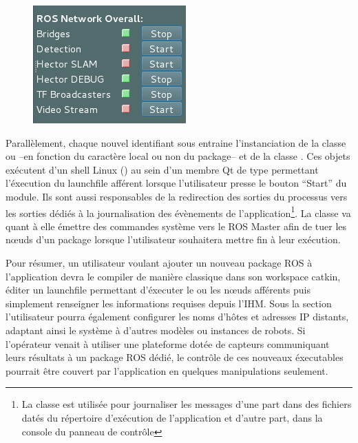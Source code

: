 \begin{figure}
  \centering
    \includegraphics[width=.3\linewidth]{figures/guicontrols}  
  \label{fig:guicontrols}
\end{figure}

Parallèlement, chaque nouvel identifiant sous  entraine l'instanciation de la classe  ou  --en fonction du caractère local ou non du package-- et de la classe 
. 
Ces objets exécutent d'un shell Linux () au sein d'un membre Qt de type  permettant l'éxecution du launchfile afférent lorsque l'utilisateur presse le bouton ``Start'' du module.
Ils sont aussi responsables de la redirection des sorties du processus vers les sorties dédiés à la journalisation des évènements de l'application\footnote{La classe  est utilisée pour journaliser les messages d'une part dans des fichiers datés du répertoire d'exécution 
de l'application et d'autre part, dans la console du panneau de contrôle}. 
La classe  va quant à elle émettre des commandes système vers le ROS Master afin de tuer les n\oe{}uds d'un package lorsque l'utilisateur souhaitera mettre fin à leur exécution. 

Pour résumer, un utilisateur voulant ajouter un nouveau package ROS à l'application devra le compiler de manière classique dans son workspace catkin, éditer un launchfile permettant d'éxecuter le ou les n\oe{}uds afférents puis
simplement renseigner les informations requises depuis l'IHM. 
Sous la section  l'utilisateur pourra également configurer les noms d'hôtes et adresses IP distants, adaptant ainsi le système à d'autres modèles ou instances de robots. 
Si l'opérateur venait à utiliser une plateforme dotée de capteurs communiquant leurs résultats à un package ROS dédié, le contrôle de ces nouveaux éxecutables pourrait être couvert par l'application en quelques manipulations seulement.  